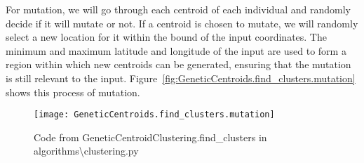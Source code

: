 \noindent
For mutation, we will go through each centroid of each individual and randomly decide if it will mutate or not.
If a centroid is chosen to mutate, we will randomly select a new location for it within the bound of the input
coordinates.
The minimum and maximum latitude and longitude of the input are used to form a region within which new centroids can
be generated, ensuring that the mutation is still relevant to the input.
Figure~\ref{fig:GeneticCentroids.find_clusters.mutation} shows this process of mutation.
\begin{figure}
    \centering
    \texttt{[image: GeneticCentroids.find\_clusters.mutation]}
    \caption{Code from GeneticCentroidClustering.find\_clusters in algorithms\textbackslash clustering.py}
    \label{GeneticCentroids.find_clusters.mutation}
\end{figure}

